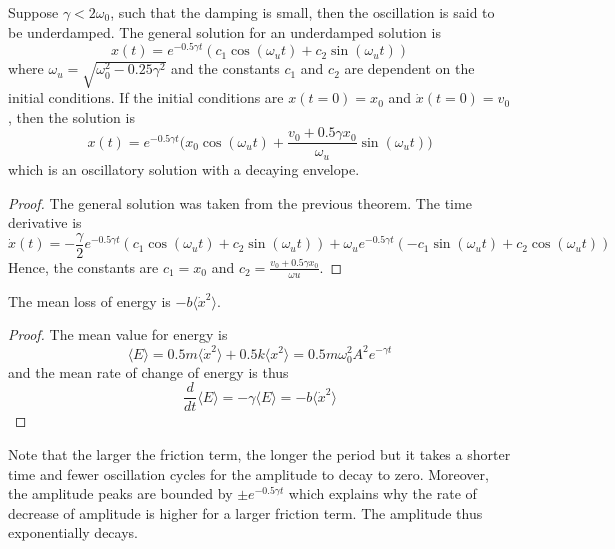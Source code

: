 \documentclass[a4paper]{article}
\begin{document}
\begin{thm}
Suppose $\gamma<2\omega_0$, such that the damping is small, then the oscillation is said to be underdamped. The general solution for an underdamped solution is
$$x(t)=e^{-0.5\gamma t}(c_1\cos(\omega_ut)+c_2\sin(\omega_ut))$$
where $\omega_u=\sqrt{\omega_0^2-0.25\gamma^2}$ and the constants $c_1$ and $c_2$ are dependent on the initial conditions. If the initial conditions are $x(t=0)=x_0$ and $\dot{x}(t=0)=v_0$, then the solution is
$$x(t)=e^{-0.5\gamma t}\bigg(x_0\cos(\omega_ut)+\frac{v_0+0.5\gamma x_0}{\omega_u}\sin(\omega_ut)\bigg)$$
which is an oscillatory solution with a decaying envelope.
\end{thm}
\begin{proof}
The general solution was taken from the previous theorem. The time derivative is
$$\dot{x}(t)=-\frac{\gamma}{2}e^{-0.5\gamma t}(c_1\cos(\omega_ut)+c_2\sin(\omega_ut))+\omega_ue^{-0.5\gamma t}(-c_1\sin(\omega_ut)+c_2\cos(\omega_ut))$$
Hence, the constants are $c_1=x_0$ and $c_2=\frac{v_0+0.5\gamma x_0}{\omega u}$.
\end{proof}
\begin{cor}
The mean loss of energy is $-b\langle\dot{x}^2\rangle$.
\end{cor}
\begin{proof}
The mean value for energy is
$$\langle E\rangle=0.5m\langle\dot{x}^2\rangle+0.5k\langle x^2\rangle=0.5m\omega_0^2A^2e^{-\gamma t}$$
and the mean rate of change of energy is thus
$$\frac{d}{dt}\langle E\rangle=-\gamma\langle E\rangle=-b\langle\dot{x}^2\rangle$$
\end{proof}
Note that the larger the friction term, the longer the period but it takes a shorter time and fewer oscillation cycles for the amplitude to decay to zero. Moreover, the amplitude peaks are bounded by $\pm e^{-0.5\gamma t}$ which explains why the rate of decrease of amplitude is higher for a larger friction term. The amplitude thus exponentially decays.
\end{document}
